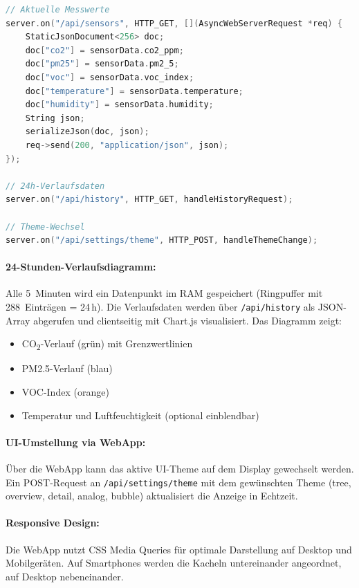 \begin{lstlisting}[language=C++,caption={WebApp API-Endpunkte},label={lst:webapp_api}]
// Aktuelle Messwerte
server.on("/api/sensors", HTTP_GET, [](AsyncWebServerRequest *req) {
    StaticJsonDocument<256> doc;
    doc["co2"] = sensorData.co2_ppm;
    doc["pm25"] = sensorData.pm2_5;
    doc["voc"] = sensorData.voc_index;
    doc["temperature"] = sensorData.temperature;
    doc["humidity"] = sensorData.humidity;
    String json;
    serializeJson(doc, json);
    req->send(200, "application/json", json);
});

// 24h-Verlaufsdaten
server.on("/api/history", HTTP_GET, handleHistoryRequest);

// Theme-Wechsel
server.on("/api/settings/theme", HTTP_POST, handleThemeChange);
\end{lstlisting}

\paragraph{24-Stunden-Verlaufsdiagramm:}
Alle 5~Minuten wird ein Datenpunkt im RAM gespeichert (Ringpuffer mit 288~Einträgen = 24\,h). Die Verlaufsdaten werden über \texttt{/api/history} als JSON-Array abgerufen und clientseitig mit Chart.js visualisiert. Das Diagramm zeigt:

\begin{itemize}[nosep]
\item CO\textsubscript{2}-Verlauf (grün) mit Grenzwertlinien
\item PM2.5-Verlauf (blau)
\item VOC-Index (orange)
\item Temperatur und Luftfeuchtigkeit (optional einblendbar)
\end{itemize}

\paragraph{UI-Umstellung via WebApp:}
Über die WebApp kann das aktive UI-Theme auf dem Display gewechselt werden. Ein POST-Request an \texttt{/api/settings/theme} mit dem gewünschten Theme (tree, overview, detail, analog, bubble) aktualisiert die Anzeige in Echtzeit.

\paragraph{Responsive Design:}
Die WebApp nutzt CSS Media Queries für optimale Darstellung auf Desktop und Mobilgeräten. Auf Smartphones werden die Kacheln untereinander angeordnet, auf Desktop nebeneinander.

